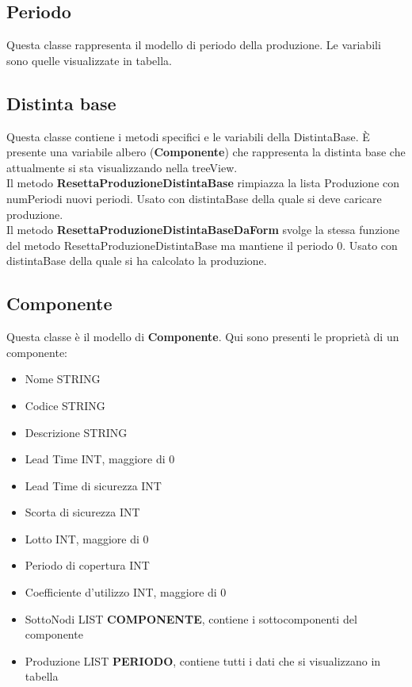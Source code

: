 \documentclass[12pt,twoside]{report}
\begin{document}
\subsection{Periodo}
Questa classe rappresenta il modello di periodo della produzione. Le variabili sono quelle visualizzate in tabella.


\subsection{Distinta base}
Questa classe contiene i metodi specifici e le variabili della DistintaBase. È presente una variabile albero (\textbf{Componente}) che rappresenta la distinta base che attualmente si sta visualizzando nella treeView.\\
Il metodo \textbf{ResettaProduzioneDistintaBase} rimpiazza la lista Produzione con numPeriodi nuovi periodi. Usato con distintaBase della quale si deve caricare produzione.\\
Il metodo \textbf{ResettaProduzioneDistintaBaseDaForm} svolge la stessa funzione del metodo ResettaProduzioneDistintaBase ma mantiene il periodo 0. Usato con distintaBase della quale si ha calcolato la produzione.


\subsection{Componente}

Questa classe è il modello di \textbf{Componente}. Qui sono presenti le proprietà di un componente:

\begin{itemize}
	\bigskip
	\bigskip
	\item Nome \space\space\space\space\space\space STRING
	\item Codice \space\space\space\space\space\space STRING
	\item Descrizione \space\space\space\space\space\space STRING
	\item Lead Time \space\space\space\space\space\space INT, maggiore di 0 
	\item Lead Time di sicurezza \space\space\space\space\space\space INT
	\item Scorta di sicurezza \space\space\space\space\space\space INT
	\item Lotto \space\space\space\space\space\space INT, maggiore di 0 
	\item Periodo di copertura  \space\space\space\space\space\space INT
	\item Coefficiente d’utilizzo \space\space\space\space\space\space INT, maggiore di 0 
	\item SottoNodi \space\space\space\space\space\space     LIST \textbf{COMPONENTE}, contiene i sottocomponenti del componente
	\item Produzione \space\space\space\space\space\space     LIST \textbf{PERIODO}, contiene tutti i dati che si visualizzano in tabella
	      	      
\end{itemize}
\end{document}

